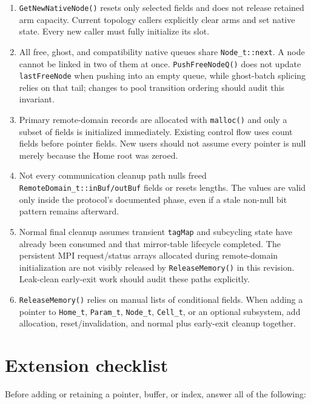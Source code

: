 \documentclass[11pt]{article}
\newcommand{\code}[1]{\texorpdfstring{\nolinkurl{#1}}{#1}}
\begin{document}
\begin{enumerate}
\item \code{GetNewNativeNode()} resets only selected fields and does not
release retained arm capacity.  Current topology callers explicitly clear
arms and set native state.  Every new caller must fully initialize its slot.

\item All free, ghost, and compatibility native queues share
\code{Node_t::next}.  A node cannot be linked in two of them at once.
\code{PushFreeNodeQ()} does not update \code{lastFreeNode} when pushing into
an empty queue, while ghost-batch splicing relies on that tail; changes to pool
transition ordering should audit this invariant.

\item Primary remote-domain records are allocated with \code{malloc()} and
only a subset of fields is initialized immediately.  Existing control flow
uses count fields before pointer fields.  New users should not assume every
pointer is null merely because the Home root was zeroed.

\item Not every communication cleanup path nulls freed
\code{RemoteDomain_t::inBuf/outBuf} fields or resets lengths.  The values are
valid only inside the protocol's documented phase, even if a stale non-null
bit pattern remains afterward.

\item Normal final cleanup assumes transient \code{tagMap} and subcycling
state have already been consumed and that mirror-table lifecycle completed.
The persistent MPI request/status arrays allocated during remote-domain
initialization are not visibly released by \code{ReleaseMemory()} in this
revision.  Leak-clean early-exit work should audit these paths explicitly.

\item \code{ReleaseMemory()} relies on manual lists of conditional fields.
When adding a pointer to \code{Home_t}, \code{Param_t}, \code{Node_t},
\code{Cell_t}, or an optional subsystem, add allocation, reset/invalidation,
and normal plus early-exit cleanup together.
\end{enumerate}

\section{Extension checklist}

Before adding or retaining a pointer, buffer, or index, answer all of the
following:
\end{document}
